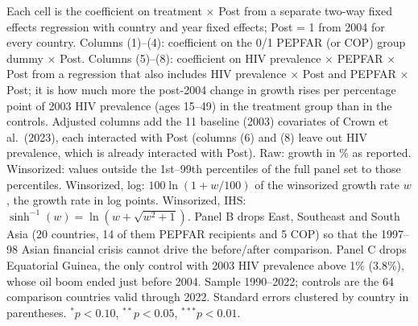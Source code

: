 \begin{table}[htbp]
\begin{minipage}{\textwidth}\footnotesize Each cell is the coefficient on treatment $\times$ Post from a separate two-way fixed effects regression with country and year fixed effects; Post = 1 from 2004 for every country. Columns (1)--(4): coefficient on the 0/1 PEPFAR (or COP) group dummy $\times$ Post. Columns (5)--(8): coefficient on HIV prevalence $\times$ PEPFAR $\times$ Post from a regression that also includes HIV prevalence $\times$ Post and PEPFAR $\times$ Post; it is how much more the post-2004 change in growth rises per percentage point of 2003 HIV prevalence (ages 15--49) in the treatment group than in the controls. Adjusted columns add the 11 baseline (2003) covariates of Crown et al.\ (2023), each interacted with Post (columns (6) and (8) leave out HIV prevalence, which is already interacted with Post). Raw: growth in \% as reported. Winsorized: values outside the 1st--99th percentiles of the full panel set to those percentiles. Winsorized, log: $100\ln(1 + w/100)$ of the winsorized growth rate $w$, the growth rate in log points. Winsorized, IHS: $\sinh^{-1}(w) = \ln(w + \sqrt{w^2+1})$. Panel B drops East, Southeast and South Asia (20 countries, 14 of them PEPFAR recipients and 5 COP) so that the 1997--98 Asian financial crisis cannot drive the before/after comparison. Panel C drops Equatorial Guinea, the only control with 2003 HIV prevalence above 1\% (3.8\%), whose oil boom ended just before 2004. Sample 1990--2022; controls are the 64 comparison countries valid through 2022. Standard errors clustered by country in parentheses. $^{*}p<0.10$, $^{**}p<0.05$, $^{***}p<0.01$.\end{minipage}
\end{table}
